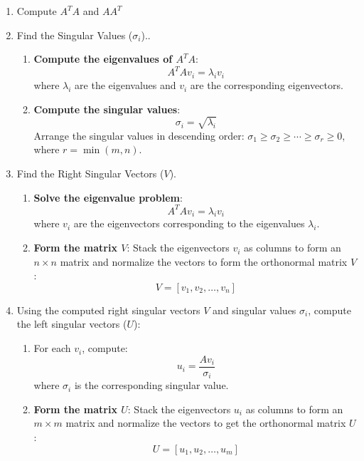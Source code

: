 \documentclass[12pt]{article}
\begin{document}
\begin{enumerate}
    \item Compute \(A^T A\) and \(A A^T\)

    \item Find the Singular Values (\(\sigma_i\)).. 
    
    \begin{enumerate}
    \item \textbf{Compute the eigenvalues of \(A^T A\)}:
    \[
    A^T A v_i = \lambda_i v_i
    \]
    where \(\lambda_i\) are the eigenvalues and \(v_i\) are the corresponding eigenvectors.

    \item \textbf{Compute the singular values}:
    \[
    \sigma_i = \sqrt{\lambda_i}
    \]
    Arrange the singular values in descending order: \(\sigma_1 \geq \sigma_2 \geq \cdots \geq \sigma_r \geq 0\), where \(r = \min(m, n)\).
    \end{enumerate}


    \item Find the Right Singular Vectors (\(V\)).

    \begin{enumerate}
    \item \textbf{Solve the eigenvalue problem}:
    \[
    A^T A v_i = \lambda_i v_i
    \]
    where \(v_i\) are the eigenvectors corresponding to the eigenvalues \(\lambda_i\).

    \item \textbf{Form the matrix \(V\)}:
    Stack the eigenvectors \(v_i\) as columns to form an \(n \times n\) matrix and normalize the vectors to form the orthonormal matrix \(V\):
    \[
    V = [v_1, v_2, \ldots, v_n]
    \]
    \end{enumerate}


    \item Using the computed right singular vectors \(V\) and singular values \(\sigma_i\), compute the left singular vectors (\(U\)):

    \begin{enumerate}
    \item For each \(v_i\), compute:
     \[
     u_i = \frac{A v_i}{\sigma_i}
     \]
     where \(\sigma_i\) is the corresponding singular value.

    \item \textbf{Form the matrix \(U\)}:
    Stack the eigenvectors \(u_i\) as columns to form an \(m \times m\) matrix and normalize the vectors to get the orthonormal matrix \(U\):
    \[
    U = [u_1, u_2, \ldots, u_m]
    \]
    \end{enumerate}



\end{enumerate}
\end{document}
